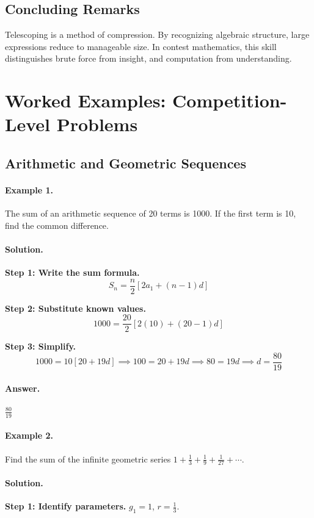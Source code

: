 \documentclass[12pt]{extarticle}
\begin{document}
\subsection*{Concluding Remarks}

Telescoping is a method of compression. By recognizing algebraic structure, large expressions reduce to manageable size. In contest mathematics, this skill distinguishes brute force from insight, and computation from understanding.

\newpage

\section{Worked Examples: Competition-Level Problems}

\subsection{Arithmetic and Geometric Sequences}

\paragraph{Example 1.} The sum of an arithmetic sequence of 20 terms is 1000. If the first term is 10, find the common difference.

\paragraph{Solution.}
\textbf{Step 1: Write the sum formula.}
\[
S_n = \frac{n}{2}[2a_1 + (n-1)d]
\]

\textbf{Step 2: Substitute known values.}
\[
1000 = \frac{20}{2}[2(10) + (20-1)d]
\]

\textbf{Step 3: Simplify.}
\[
1000 = 10[20 + 19d] \implies 100 = 20 + 19d \implies 80 = 19d \implies d = \frac{80}{19}
\]

\paragraph{Answer.} $\boxed{\frac{80}{19}}$

\paragraph{Example 2.} Find the sum of the infinite geometric series $1 + \frac{1}{3} + \frac{1}{9} + \frac{1}{27} + \cdots$.

\paragraph{Solution.}
\textbf{Step 1: Identify parameters.} $g_1 = 1$, $r = \frac{1}{3}$.
\end{document}
